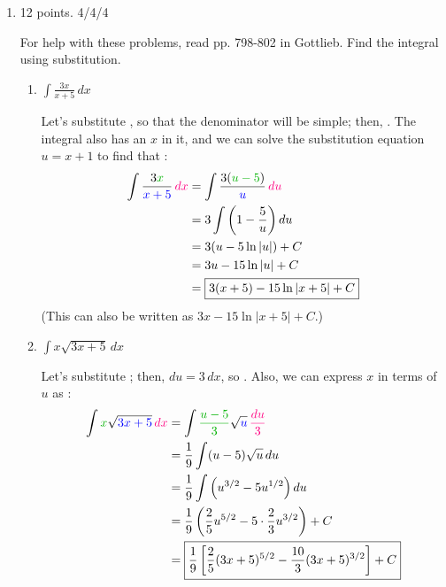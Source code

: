\documentclass{article}
\begin{document}
\begin{enumerate}
\item 

\begin{grading}
12 points. 4/4/4  
\end{grading}

 For help with these problems, read pp. 798-802 in Gottlieb. Find the integral using substitution.

    \begin{enumerate}
    \item
      \begin{problem}[\vfill]
        $\displaystyle\int \frac{3x}{x+5}\,dx$
      \end{problem}

      \begin{solution}
        Let's substitute , so that the denominator will
        be simple; then, .  The integral also has an $x$
        in it, and we can solve the substitution equation $u = x + 1$ to
        find that :
        \begin{align*}
          \int \frac{3\sube{x}}{\sub{x + 5}}\,\subd{dx} &= \int
          \frac{3(\sube{u - 5})}{\sub{u}}\,\subd{du} \\
          &= 3\int \left( 1 - \frac{5}{u} \right) du \\
          &= 3(u - 5\ln |u|) + C \\
          &= 3u - 15\ln |u| + C \\
          &= \boxed{3(x + 5) - 15\ln |x + 5| + C}
        \end{align*}
        (This can also be written as $3x - 15\ln |x + 5| + C$.)
      \end{solution}

    \item
      \begin{problem}[\vfill]
        $\displaystyle\int x\sqrt{3x+5}\,dx$
      \end{problem}

      \begin{solution}
        Let's substitute ; then, $du = 3\,dx$, so
        .  Also, we can express $x$ in terms of
        $u$ as :
        \begin{align*}
          \int \sube{x} \sqrt{\sub{3x + 5}}\,\subd{dx} &= \int
          \sube{\frac{u - 5}{3}} \sqrt{\sub{u}}\,\subd{\frac{du}{3}} \\
          &= \frac{1}{9} \int (u - 5) \sqrt{u}\,du \\
          &= \frac{1}{9} \int \left( u^{3/2} - 5 u^{1/2} \right) du \\
          &= \frac{1}{9} \left( \frac{2}{5} u^{5/2} - 5 \cdot \frac{2}{3}
            u^{3/2} \right) + C \\
          &= \boxed{\frac{1}{9} \left[ \frac{2}{5} (3x + 5)^{5/2} -
              \frac{10}{3} (3x + 5)^{3/2} \right] + C }
        \end{align*}
      \end{solution}


\end{enumerate}
\end{enumerate}
\end{document}
